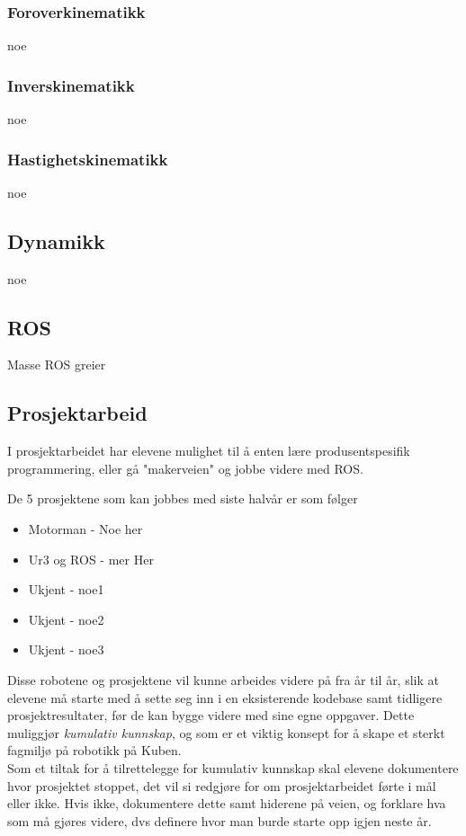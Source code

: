     \subsubsection{Foroverkinematikk}
        noe


    \subsubsection{Inverskinematikk}
        noe


    \subsubsection{Hastighetskinematikk}
        noe


\subsection{Dynamikk}
        noe



\subsection{ROS}
        Masse ROS greier

\subsection{Prosjektarbeid}

    I prosjektarbeidet har elevene mulighet til å enten lære produsentspesifik programmering, eller gå "makerveien" og jobbe videre med ROS.

    De 5 prosjektene som kan jobbes med siste halvår er som følger
    \begin{itemize}
        \item Motorman - Noe her
        \item Ur3 og ROS - mer Her
        \item Ukjent - noe1
        \item Ukjent - noe2
        \item Ukjent - noe3
    \end{itemize}

    Disse robotene og prosjektene vil kunne arbeides videre på fra år til år, slik at elevene må starte med å sette seg inn i en eksisterende kodebase samt tidligere prosjektresultater, før de kan bygge videre med sine egne oppgaver. Dette muliggjør \emph{kumulativ kunnskap}, og som er et viktig konsept for å skape et sterkt fagmiljø på robotikk på Kuben.\\

    Som et tiltak for å tilrettelegge for kumulativ kunnskap skal elevene dokumentere hvor prosjektet stoppet, det vil si redgjøre for om prosjektarbeidet førte i mål eller ikke. Hvis ikke, dokumentere dette samt hiderene på veien, og forklare hva som må gjøres videre, dvs definere hvor man burde starte opp igjen neste år.

